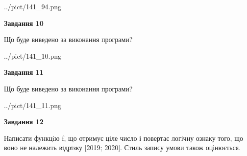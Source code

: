 \documentclass[12pt, ukrainian]{article}
\begin{document}
{\begin {large}
\begin{center}
	{../pict/141_94.png}
\end{center}
\newpage

{\begin {center}\textbf{Завдання 10}\end {center}}

Що буде виведено за виконання програми?\par
\begin{center}
	{../pict/141_10.png}
\end{center}
\newpage

{\begin {center}\textbf{Завдання 11}\end {center}}

Що буде виведено за виконання програми?\par
\begin{center}
	{../pict/141_11.png}
\end{center}
\newpage

{\begin {center}\textbf{Завдання 12}\end {center}}


Написати функцiю f, що отримує ціле число і повертає логічну ознаку того, що воно не належить вiдрiзку [2019; 2020]. Стиль запису умови також оцінюється.\par
\newpage

\end {large}}
\end{document}
